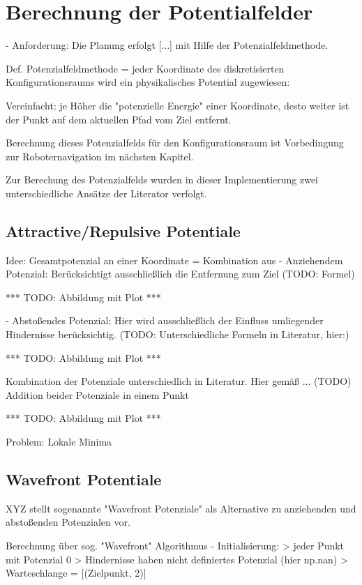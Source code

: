 \chapter{Berechnung der Potentialfelder}

- Anforderung: Die Planung erfolgt [...] mit Hilfe der Potenzialfeldmethode.

Def. Potenzialfeldmethode = jeder Koordinate des diskretisierten Konfigurationsraums wird ein physikalisches Potential zugewiesen:

Vereinfacht: je Höher die "potenzielle Energie" einer Koordinate, desto weiter ist der Punkt auf dem aktuellen Pfad vom Ziel entfernt.

Berechnung dieses Potenzialfelds für den Konfigurationsraum ist Vorbedingung zur Roboternavigation im nächsten Kapitel.

Zur Berechung des Potenzialfelds wurden in dieser Implementierung zwei unterschiedliche Ansätze der Literator verfolgt.

\section{Attractive/Repulsive Potentiale}

Idee: Gesamtpotenzial an einer Koordinate = Kombination aus 
- Anziehendem Potenzial: Berücksichtigt ausschließlich die Entfernung zum Ziel (TODO: Formel)

*** TODO: Abbildung mit Plot ***

- Abstoßendes Potenzial: Hier wird ausschließlich der Einfluss umliegender Hindernisse berücksichtig. (TODO: Unterschiedliche Formeln in Literatur, hier:)

*** TODO: Abbildung mit Plot ***

Kombination der Potenziale unterschiedlich in Literatur. Hier gemäß ... (TODO) Addition beider Potenziale in einem Punkt

*** TODO: Abbildung mit Plot ***

Problem: Lokale Minima


\section{Wavefront Potentiale}

XYZ stellt sogenannte "Wavefront Potenziale" als Alternative zu anziehenden und abstoßenden Potenzialen vor.

Berechnung über sog. "Wavefront" Algorithmus 
- Initialisierung:
	> jeder Punkt mit Potenzial 0 
	> Hindernisse haben nicht definiertes Potenzial (hier np.nan)
	> Warteschlange = [(Zielpunkt, 2)]	

